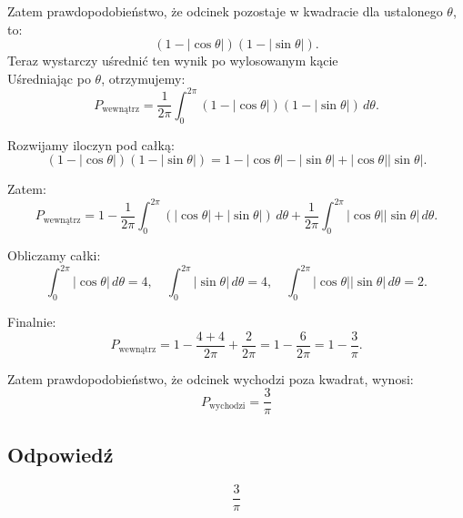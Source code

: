 Zatem prawdopodobieństwo, że odcinek pozostaje w kwadracie dla ustalonego \(\theta\), to:
\[
	(1 - |\cos\theta|)(1 - |\sin\theta|).
\]
Teraz wystarczy uśrednić ten wynik po wylosowanym kącie \\
Uśredniając po \(\theta\), otrzymujemy:
\[
	P_{\text{wewnątrz}} = \frac{1}{2\pi} \int_0^{2\pi} (1 - |\cos\theta|)(1 - |\sin\theta|) \, d\theta.
\]

Rozwijamy iloczyn pod całką:
\[
	(1 - |\cos\theta|)(1 - |\sin\theta|) = 1 - |\cos\theta| - |\sin\theta| + |\cos\theta||\sin\theta|.
\]

Zatem:
\[
	P_{\text{wewnątrz}} = 1 - \frac{1}{2\pi} \int_0^{2\pi} (|\cos\theta| + |\sin\theta|) \, d\theta + \frac{1}{2\pi} \int_0^{2\pi} |\cos\theta||\sin\theta| \, d\theta.
\]

Obliczamy całki:
\[
	\int_0^{2\pi} |\cos\theta| \, d\theta = 4, \quad \int_0^{2\pi} |\sin\theta| \, d\theta = 4, \quad \int_0^{2\pi} |\cos\theta||\sin\theta| \, d\theta = 2.
\]

Finalnie:
\[
	P_{\text{wewnątrz}} = 1 - \frac{4+4}{2\pi} + \frac{2}{2\pi} = 1 - \frac{6}{2\pi} = 1 - \frac{3}{\pi}.
\]

Zatem prawdopodobieństwo, że odcinek wychodzi poza kwadrat, wynosi:
\[
	P_{\text{wychodzi}} = \frac{3}{\pi}
\]


\subsection*{Odpowiedź}
\[
	\boxed{\frac{3}{\pi}}
\]
